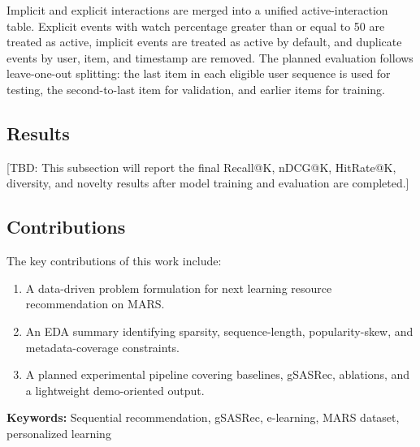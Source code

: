 Implicit and explicit interactions are merged into a unified active-interaction table. Explicit events with watch percentage greater than or equal to 50 are treated as active, implicit events are treated as active by default, and duplicate events by user, item, and timestamp are removed. The planned evaluation follows leave-one-out splitting: the last item in each eligible user sequence is used for testing, the second-to-last item for validation, and earlier items for training.

\subsection*{Results}

[TBD: This subsection will report the final Recall@K, nDCG@K, HitRate@K, diversity, and novelty results after model training and evaluation are completed.]

\subsection*{Contributions}

The key contributions of this work include:
\begin{enumerate}
    \item A data-driven problem formulation for next learning resource recommendation on MARS.
    \item An EDA summary identifying sparsity, sequence-length, popularity-skew, and metadata-coverage constraints.
    \item A planned experimental pipeline covering baselines, gSASRec, ablations, and a lightweight demo-oriented output.
\end{enumerate}

\vspace{1cm}

\noindent \textbf{Keywords:} Sequential recommendation, gSASRec, e-learning, MARS dataset, personalized learning

\newpage
